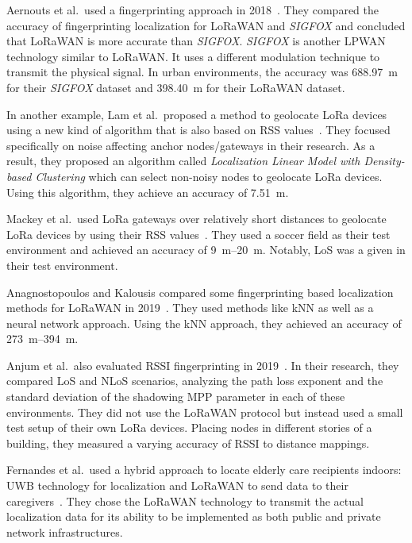 Aernouts et al.\ used a fingerprinting approach in 2018~\cite{aernouts_sigfox_2018}.
They compared the accuracy of fingerprinting localization for \ac{LoRaWAN} and \emph{SIGFOX} and concluded that \ac{LoRaWAN} is more accurate than \emph{SIGFOX}.
\emph{SIGFOX} is another \ac{LPWAN} technology similar to \ac{LoRaWAN}.
It uses a different modulation technique to transmit the physical signal.
In urban environments, the accuracy was \SI{688.97}{\meter} for their \emph{SIGFOX} dataset and \SI{398.40}{\meter} for their LoRaWAN dataset.

In another example, Lam et al.~proposed a method to geolocate \ac{LoRa} devices using a new kind of algorithm that is also based on \ac{RSS} values~\cite{lam_new_2018}.
They focused specifically on noise affecting anchor nodes/gateways in their research.
As a result, they proposed an algorithm called \emph{Localization Linear Model with Density-based Clustering} which can select non-noisy nodes to geolocate \ac{LoRa} devices.
Using this algorithm, they achieve an accuracy of \SI{7.51}{\meter}.

Mackey et al.~used \ac{LoRa} gateways over relatively short distances to geolocate \ac{LoRa} devices by using their \ac{RSS} values~\cite{mackey_lora-based_2019}.
They used a soccer field as their test environment and achieved an accuracy of \SIrange{9}{20}{\meter}.
Notably, \ac{LoS} was a given in their test environment.

Anagnostopoulos and Kalousis compared some fingerprinting based localization methods for \ac{LoRaWAN} in 2019~\cite{anagnostopoulos_reproducible_2019}.
They used methods like \ac{kNN} as well as a neural network approach.
Using the \ac{kNN} approach, they achieved an accuracy of \SIrange{273}{394}{\meter}.

Anjum et al.\ also evaluated \ac{RSSI} fingerprinting in 2019~\cite{anjum_analysis_2019}.
In their research, they compared \ac{LoS} and \ac{NLoS} scenarios, analyzing the path loss exponent and the standard deviation of the shadowing \ac{MPP} parameter in each of these environments.
They did not use the \ac{LoRaWAN} protocol but instead used a small test setup of their own \ac{LoRa} devices.
Placing nodes in different stories of a building, they measured a varying accuracy of \ac{RSSI} to distance mappings.

Fernandes et al.\ used a hybrid approach to locate elderly care recipients indoors: \ac{UWB} technology for localization and \ac{LoRaWAN} to send data to their caregivers~\cite{fernandes_hybrid_2020}.
They chose the \ac{LoRaWAN} technology to transmit the actual localization data for its ability to be implemented as both public and private network infrastructures.

